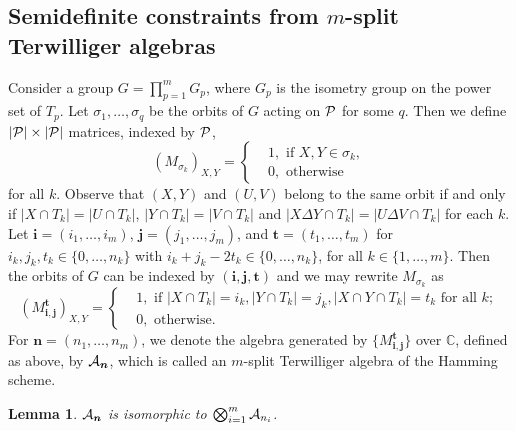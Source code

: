 \documentclass[final,onecolumn]{IEEEtran}
\newtheorem{lemmaenv}[definitionenv]{Lemma}
\newenvironment{lemma}{\begin{lemmaenv}\rm}{\end{lemmaenv}}
\theoremstyle{definition}
\newcommand{\bmi}{{\bm i}}
\newcommand{\bmj}{{\bm j}}
\newcommand{\bmn}{{\bm n}}
\newcommand{\bmt}{{\bm t}}
\begin{document}
\subsection{Semidefinite constraints from  \texorpdfstring{$m$}--split Terwilliger algebras}
Consider a group $G = \prod_{p = 1}^{m}G_{p}$, where $G_{p}$ is the isometry group on the power set of $T_{p}$. Let $\sigma_{1}, \dots, \sigma_{q}$ be the orbits of $G$ acting on ${\cal P}$ for some $q$. Then we define  $\lvert {\cal P}\rvert \times \lvert {\cal P}\rvert$ matrices, indexed by ${\cal P}$, 
\begin{equation*}
	(M_{\sigma_{k}})_{X, Y} = \left\{
	\begin{aligned}
		&1, \text{ if } X, Y \in \sigma_{k},\\
		&0, \text{ otherwise}
	\end{aligned}\right.
\end{equation*}
for all $k$. Observe that $(X, Y)$ and $(U, V)$ belong to the same orbit if and only if $\lvert X \cap T_{k}\rvert = \lvert U \cap T_{k}\rvert$, $\lvert Y \cap T_{k}\rvert = \lvert V \cap T_{k}\rvert$ and $\lvert X \Delta Y \cap T_{k}\rvert = \lvert U \Delta V \cap T_{k}\rvert$ for each $k$. Let $\bmi = (i_{1}, \dots, i_{m})$, $\bmj = (j_{1}, \dots, j_{m})$, and $\bmt = (t_{1}, \dots, t_{m})$ for $i_{k}, j_{k}, t_{k} \in \{0, \dots, n_{k}\}$ with $i_{k} + j_{k} - 2t_{k} \in \{0, \dots, n_{k}\}$, for all $k \in \{1, \dots, m\}$. Then the orbits of $G$ can be indexed by $(\bmi, \bmj, \bmt)$ and we may rewrite $M_{\sigma_{k}}$ as
\begin{equation*}
	(M_{\bmi, \bmj}^{\bmt})_{X, Y} = \left\{
	\begin{aligned}
		&1, \text{ if } \lvert X \cap T_{k}\rvert = i_{k}, \lvert Y \cap T_{k}\rvert = j_{k}, \lvert X \cap Y \cap T_{k}\rvert = t_{k} \text{ for all } k;\\
		&0, \text{ otherwise.}
	\end{aligned}\right.
\end{equation*}
For $\bmn = (n_{1}, \dots, n_{m})$, we denote  the algebra generated by $\{M_{\bmi, \bmj}^{\bmt}\}$ over $\mathbb{C}$, defined as above, by ${\cal A}_{\bmn}$, which is called an $m$-split Terwilliger algebra of the Hamming scheme.
	
\begin{lemma}
	${\cal A}_{\bmn}$ is isomorphic to $\bigotimes_{i = 1}^{m} {\cal A}_{n_{i}}$. 
\end{lemma}
	
\end{document}
